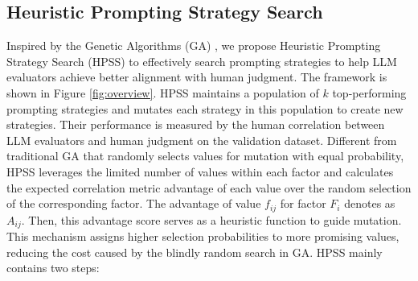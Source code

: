 \subsection{Heuristic Prompting Strategy Search}
Inspired by the Genetic Algorithms (GA) \cite{mitchell1980need}, we propose Heuristic Prompting Strategy Search (HPSS) to effectively search prompting strategies to help LLM evaluators achieve better alignment with human judgment. 
The framework is shown in Figure \ref{fig:overview}.
HPSS maintains a population of $k$ top-performing prompting strategies and mutates each strategy in this population to create new strategies. 
Their performance is measured by the human correlation between LLM evaluators and human judgment on the validation dataset.
Different from traditional GA that randomly selects values for mutation with equal probability, 
HPSS leverages the limited number of values within each factor 
and calculates the expected correlation metric advantage of each value over the random selection of the corresponding factor. 
The advantage of value $ f_{ij} $ for factor $ F_i $ denotes as $ A_{ij} $. 
Then, this advantage score serves as a heuristic function to guide mutation. 
This mechanism assigns higher selection probabilities to more promising values, reducing the cost caused by the blindly random search in GA. 
HPSS mainly contains two steps:


